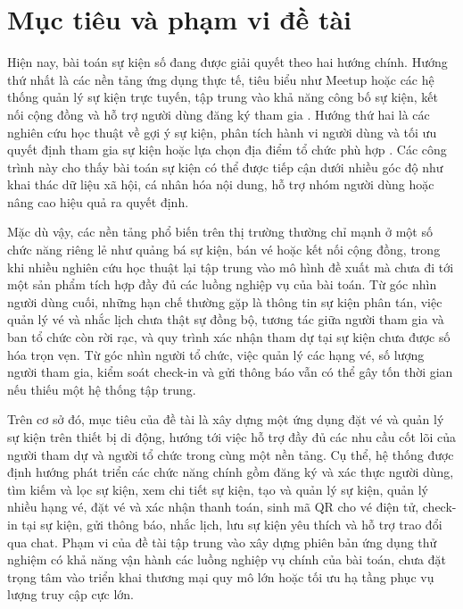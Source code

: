 \documentclass[../DoAn.tex]{subfiles}
\begin{document}
\section{Mục tiêu và phạm vi đề tài}
\label{section:1.2}
Hiện nay, bài toán sự kiện số đang được giải quyết theo hai hướng chính. Hướng thứ nhất là các nền tảng ứng dụng thực tế, tiêu biểu như Meetup hoặc các hệ thống quản lý sự kiện trực tuyến, tập trung vào khả năng công bố sự kiện, kết nối cộng đồng và hỗ trợ người dùng đăng ký tham gia \cite{meetup2026about}. Hướng thứ hai là các nghiên cứu học thuật về gợi ý sự kiện, phân tích hành vi người dùng và tối ưu quyết định tham gia sự kiện hoặc lựa chọn địa điểm tổ chức phù hợp \cite{cena2014event,liao2020acger,zhang2019gevr}. Các công trình này cho thấy bài toán sự kiện có thể được tiếp cận dưới nhiều góc độ như khai thác dữ liệu xã hội, cá nhân hóa nội dung, hỗ trợ nhóm người dùng hoặc nâng cao hiệu quả ra quyết định.

Mặc dù vậy, các nền tảng phổ biến trên thị trường thường chỉ mạnh ở một số chức năng riêng lẻ như quảng bá sự kiện, bán vé hoặc kết nối cộng đồng, trong khi nhiều nghiên cứu học thuật lại tập trung vào mô hình đề xuất mà chưa đi tới một sản phẩm tích hợp đầy đủ các luồng nghiệp vụ của bài toán. Từ góc nhìn người dùng cuối, những hạn chế thường gặp là thông tin sự kiện phân tán, việc quản lý vé và nhắc lịch chưa thật sự đồng bộ, tương tác giữa người tham gia và ban tổ chức còn rời rạc, và quy trình xác nhận tham dự tại sự kiện chưa được số hóa trọn vẹn. Từ góc nhìn người tổ chức, việc quản lý các hạng vé, số lượng người tham gia, kiểm soát check-in và gửi thông báo vẫn có thể gây tốn thời gian nếu thiếu một hệ thống tập trung.

Trên cơ sở đó, mục tiêu của đề tài là xây dựng một ứng dụng đặt vé và quản lý sự kiện trên thiết bị di động, hướng tới việc hỗ trợ đầy đủ các nhu cầu cốt lõi của người tham dự và người tổ chức trong cùng một nền tảng. Cụ thể, hệ thống được định hướng phát triển các chức năng chính gồm đăng ký và xác thực người dùng, tìm kiếm và lọc sự kiện, xem chi tiết sự kiện, tạo và quản lý sự kiện, quản lý nhiều hạng vé, đặt vé và xác nhận thanh toán, sinh mã QR cho vé điện tử, check-in tại sự kiện, gửi thông báo, nhắc lịch, lưu sự kiện yêu thích và hỗ trợ trao đổi qua chat. Phạm vi của đề tài tập trung vào xây dựng phiên bản ứng dụng thử nghiệm có khả năng vận hành các luồng nghiệp vụ chính của bài toán, chưa đặt trọng tâm vào triển khai thương mại quy mô lớn hoặc tối ưu hạ tầng phục vụ lượng truy cập cực lớn.
\end{document}
